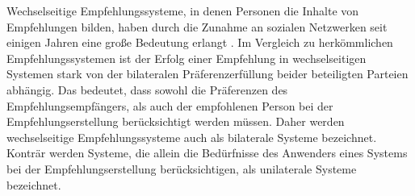 Wechselseitige Empfehlungssysteme, in denen Personen die Inhalte von Empfehlungen bilden, haben durch die Zunahme an sozialen Netzwerken seit einigen Jahren eine große Bedeutung erlangt \cite[S. 2429]{palomares:inproceedings}.
Im Vergleich zu herkömmlichen Empfehlungssystemen ist der Erfolg einer Empfehlung in wechselseitigen Systemen stark von der bilateralen Präferenzerfüllung beider beteiligten Parteien abhängig.
Das bedeutet, dass sowohl die Präferenzen des Empfehlungsempfängers, als auch der empfohlenen Person bei der Empfehlungserstellung berücksichtigt werden müssen.
Daher werden wechselseitige Empfehlungssysteme auch als bilaterale Systeme bezeichnet.
Konträr werden Systeme, die allein die Bedürfnisse des Anwenders eines Systems bei der Empfehlungserstellung berücksichtigen, als unilaterale Systeme bezeichnet.

